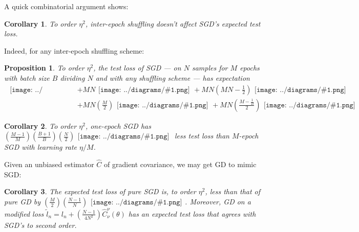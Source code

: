 \documentclass{article}
\newtheorem{cor}{Corollary}
\newtheorem{prop}{Proposition}
\newcommand{\wrap}[1]{\left( #1 \right)}
\newcommand{\mdia}[1]{\begin{gathered}\texttt{[image: ../diagrams/\#1.png]}\end{gathered}}
\newcommand{\sdia}[1]{\begin{gathered}\texttt{[image: ../diagrams/\#1.png]}\end{gathered}}
\begin{document}
    A quick combinatorial argument shows:
    \begin{cor}
        To order $\eta^2$, inter-epoch shuffling doesn't affect SGD's
        expected test loss.
    \end{cor}
    Indeed, for any inter-epoch shuffling scheme: 
    \begin{prop}\label{prop:ordtwo}
        To order $\eta^2$, the test loss of SGD --- on $N$
        samples for $M$ epochs with batch size $B$ dividing $N$ and with any
        shuffling scheme --- has expectation
        {\small
        \begin{align*}
                                                    \mdia{(0)()}
            &+ MN                                   \mdia{(0-1)(01)}
             + MN\wrap{MN - \frac{1}{2}}            \mdia{(0-1-2)(01-12)} \\
            &+ MN\wrap{\frac{M}{2}}                 \mdia{c(01-2)(02-12)}  
             + MN\wrap{\frac{M-\frac{1}{B}}{2}}     \mdia{c(01-2)(01-12)}
        \end{align*}
        }
    \end{prop}

    \begin{cor}
        To order $\eta^2$, one-epoch SGD has 
        $
             \wrap{\frac{M-1}{M}}\wrap{\frac{B+1}{B}}\wrap{\frac{N}{2}} \mdia{c(01-2)(01-12)}
        $
        less test loss than $M$-epoch SGD with learning rate $\eta/M$. 
    \end{cor}

    Given an unbiased estimator $\hat{C}$ of gradient covariance, we may get
    GD to mimic SGD:
    \begin{cor}
        The expected test loss of pure SGD is, to order $\eta^2$,
        less than that of pure GD by
        $
              \wrap{\frac{M}{2}} \wrap{\frac{N-1}{N}} \sdia{c(01-2)(01-12)}
        $.
        Moreover, GD on a modified loss 
        $
            \tilde l_n = l_n + \wrap{\frac{N-1}{4N^2}} \hat{C}_\nu^\nu(\theta)
        $
        has an expected test loss that agrees with SGD's to second order.
    \end{cor}
\end{document}
